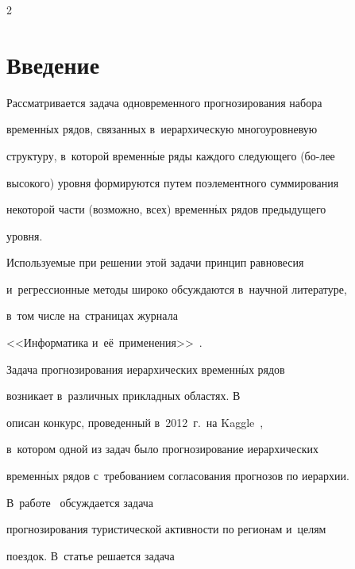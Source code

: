 \thispagestyle{headings}



\begin{multicols}{2}



\label{st\stat}







\section{Введение}



Рассматривается задача одновременного прогнозирования набора

временн$\acute{\mbox{ы}}$х рядов, связанных в~иерархическую многоуровневую

структуру, в~которой временн$\acute{\mbox{ы}}$е ряды каждого следующего (бо-\linebreak лее

высокого) уровня формируются путем поэлементного суммирования

некоторой части (возможно, всех) временн$\acute{\mbox{ы}}$х рядов предыдущего

уровня.

%

Используемые при решении этой задачи принцип равновесия

и~регрессионные методы широко обсуждаются в~научной литературе,

в~том числе на~страницах журнала

<<Информатика и~её~применения>>~\cite{tokmakova2012hyper, vasilyev2014using}.



Задача прогнозирования иерархических вре\-мен\-н$\acute{\mbox{ы}}$х рядов

возникает в~различных прикладных областях. В~\cite{hong2014global}

описан конкурс, проведенный в~2012~г.\ на Kaggle~\cite{kaggle},

в~котором одной из задач было прогнозирование иерархических

временн$\acute{\mbox{ы}}$х рядов с~требованием согласования прогнозов по иерархии.

В~работе~\cite{hyndman2011optimal} обсуждается задача

прогнозирования туристической активности по регионам и~целям

поездок. В~статье \cite{kuznetsov2011smoothing} решается задача


\end{multicols}
